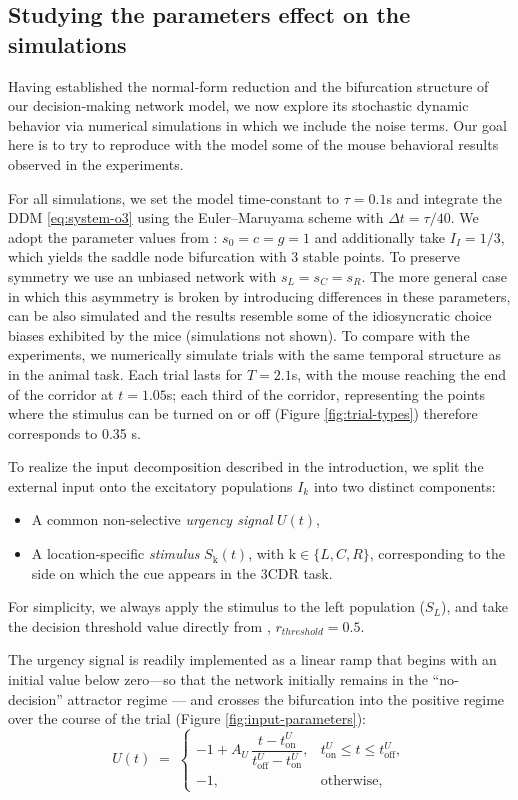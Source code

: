 \documentclass[12,twoside]{TFG-GM}
\theoremstyle{definition}
\theoremstyle{remark}
\newcommand{\kk}{\mathrm{k}}
\begin{document}
\subsection{Studying the parameters effect on the simulations}
Having established the normal‐form reduction and the bifurcation structure of our decision‐making network model, we now explore its stochastic dynamic behavior via numerical simulations in which we include the noise terms.  Our goal here is to try to reproduce with the model some of the mouse behavioral results observed in the experiments.

For all simulations, we set the model time‐constant to \(\tau=0.1\)s and integrate the DDM \eqref{eq:system-o3} using the Euler–Maruyama scheme with \(\Delta t = \tau/40\).  We adopt the parameter values from \cite{roxin2019}: \(s_{0}=c=g=1\) and additionally take \(I_{I}=1/3\), which yields the saddle node bifurcation with 3 stable points. To preserve symmetry we use an unbiased network with \(s_{L}=s_{C}=s_{R}\). The more general case in which this asymmetry is broken by introducing differences in these parameters, can be also simulated and the results resemble some of the idiosyncratic choice biases exhibited by the mice (simulations not shown). To compare with the experiments, we numerically simulate trials with the same temporal structure as in the animal task. Each trial lasts for \(T=2.1\)s, with the mouse reaching the end of the corridor at \(t=1.05\)s; each third of the corridor, representing the points where the stimulus can be turned on or off (Figure \ref{fig:trial-types}) therefore corresponds to 0.35 s.  

To realize the input decomposition described in the introduction, we split the external input onto the excitatory populations \(I_k\) into two distinct components:
\begin{itemize}
  \item A common non‐selective \emph{urgency signal} \(U(t)\), 
  \item A location‐specific \emph{stimulus} \(S_{\kk}(t)\), with \(\kk\in\{L,C,R\}\), corresponding to the side on which the cue appears in the 3CDR task.
\end{itemize}
For simplicity, we always apply the stimulus to the left population (\(S_L\)), and take the decision threshold value directly from \cite{roxin2019}, $r_{threshold} = 0.5$.

The urgency signal is readily implemented as a linear ramp that begins with an initial value below zero—so that the network initially remains in the ``no‐decision'' attractor regime — and crosses the bifurcation into the positive regime over the course of the trial (Figure \ref{fig:input-parameters}):
\[
U(t) \;=\;
\begin{cases}
-1 + A_U\,\dfrac{t - t_{\mathrm{on}}^U}{t_{\mathrm{off}}^U - t_{\mathrm{on}}^U}, 
& t_{\mathrm{on}}^U \le t \le t_{\mathrm{off}}^U,\\[6pt]
-1, & \text{otherwise},
\end{cases}
\]
\end{document}
